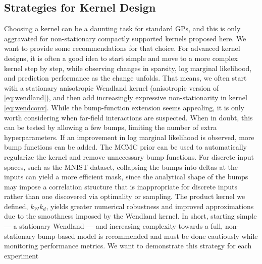 \documentclass{article}
\begin{document}
\subsection{Strategies for Kernel Design}
Choosing a kernel can be a daunting task for standard GPs, and this is only aggravated for non-stationary compactly supported kernels proposed here. We want to provide some recommendations for that choice. For advanced kernel designs, it is often a good idea to start simple and move to a more complex kernel step by step, while observing changes in sparsity, log marginal likelihood, and prediction performance as the change unfolds. That means, we often start with a stationary anisotropic Wendland kernel (anisotropic version of \eqref{eq:wendland}), and then add increasingly expressive non-stationarity in kernel \eqref{eq:wendconv}. While the bump-function extension seems appealing, it is only worth considering when far-field interactions are suspected. When in doubt, this can be tested by allowing a few bumps, limiting the number of extra hyperparameters. If an improvement in log marginal likelihood is observed, more bump functions can be added. The MCMC prior can be used to automatically regularize the kernel and remove unnecessary bump functions. For discrete input spaces, such as the MNIST dataset, collapsing the bumps into deltas at the inputs can yield a more efficient mask, since the analytical shape of the bumps may impose a correlation structure that is inappropriate for discrete inputs rather than one discovered via optimality or sampling. The product kernel we defined, $k_{\mathcal{W}} k_{d}$, yields greater numerical robustness and improved approximations due to the smoothness imposed by the Wendland kernel. In short, starting simple --- a stationary Wendland --- and increasing complexity towards a full, non-stationary bump-based model is recommended and must be done cautiously while monitoring performance metrics. We want to demonstrate this strategy for each experiment
\end{document}
